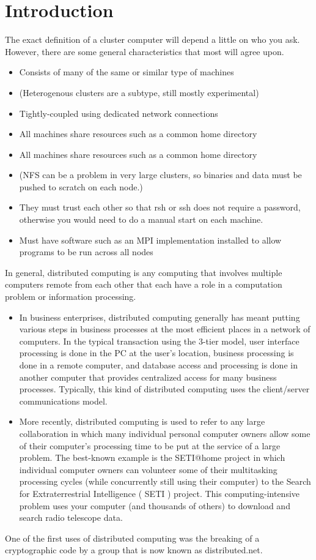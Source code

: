 \cleardoublepage
{}
{}
\chapter{Introduction}

 The exact definition of a cluster computer will depend a little on who you ask. However, there are some general characteristics that most will agree upon.
\begin{itemize}
\item Consists of many of the same or similar type of machines
\item (Heterogenous clusters are a subtype, still mostly experimental)
\item Tightly-coupled using dedicated network connections
\item All machines share resources such as a common home directory
\item All machines share resources such as a common home directory
\item (NFS can be a problem in very large clusters, so binaries and data must be pushed to scratch on each node.)
\item  They must trust each other so that rsh or ssh does not require a password,
    otherwise you would need to do a manual start on each machine.
\item Must have software such as an MPI implementation installed to allow programs to be run across all nodes 
\end{itemize}
In general, distributed computing is any computing that involves multiple computers remote from each other that each have a role in a computation problem or information processing.
\begin{itemize}
\item In business enterprises, distributed computing generally has meant putting various steps in business processes at the most efficient places in a network of computers. In the typical transaction using the 3-tier model, user interface processing is done in the PC at the user's location, business processing is done in a remote computer, and database access and processing is done in another computer that provides centralized access for many business processes. Typically, this kind of distributed computing uses the client/server communications model.
\item More recently, distributed computing is used to refer to any large collaboration in which many individual personal computer owners allow some of their computer's processing time to be put at the service of a large problem. The best-known example is the SETI@home project in which individual computer owners can volunteer some of their multitasking processing cycles (while concurrently still using their computer) to the Search for Extraterrestrial Intelligence ( SETI ) project. This computing-intensive problem uses your computer (and thousands of others) to download and search radio telescope data.
\end{itemize}
One of the first uses of distributed computing was the breaking of a cryptographic code by a group that is now known as distributed.net.

    
   
    
